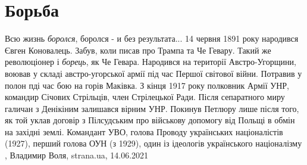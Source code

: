  
 
 
 
 
\chapter{Борьба}

Всю жизнь \emph{боролся}, боролся - и без результата... 14 червня 1891 року
народився Євген Коновалець. Забув, коли писав про Трампа та Че Гевару. Такий
же революціонер і \emph{борець}, як Че Гевара. Народився на території
Австро-Угорщини, воював у складі австро-угорської армії під час Першої світової
війни. Потравив у полон пді час бою на горів Маківка. З кінця 1917 року
полковник Армії УНР, командир Січових Стрільців, член Стрілецької Ради. Після
сепаратного миру галичан з Денікіним залишався вірним УНР. Покинув Петлюру лише
після того, як той уклав договір з Пілсудським про військову допомогу від
Польщі в обмін на західні землі. Командант УВО, голова Проводу українських
націоналістів (1927), перший голова ОУН (з 1929), один із ідеологів
українського націоналізму
, 
Владимир Воля, strana.ua, 14.06.2021

